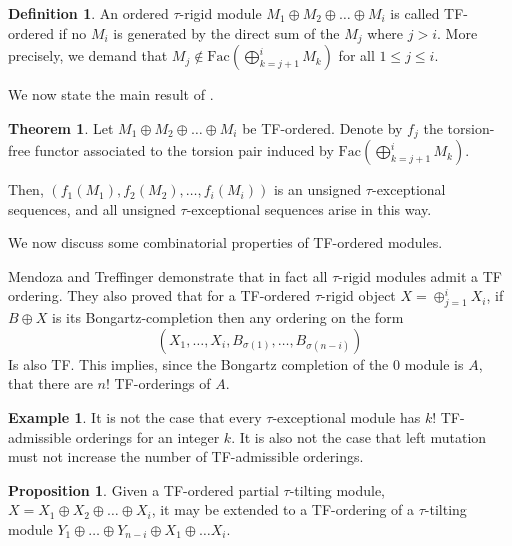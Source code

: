 \documentclass[]{article}
\theoremstyle{definition}
\newtheorem{definition}{Definition}[section]
\newtheorem{theorem}{Theorem}[section]
\newtheorem{proposition}{Proposition}[section]
\newtheorem{example}{Example}[section]
\newcommand{\tu}{\ensuremath{\tau}}
\begin{document}
\begin{definition}\cite{mendoza2020stratifying}
	An ordered \tu-rigid module $M_1 \oplus M_2 \oplus \dots \oplus M_i$ is called TF-ordered if no $M_i$ is generated by the direct sum of the $M_j$ where $j > i$. More precisely, we demand that $M_j \notin \text{Fac}(\bigoplus_{k = j+1}^i M_k)$ for all $1 \leq j \leq i$.
\end{definition}

We now state the main result of \cite{mendoza2020stratifying}.

\begin{theorem}\cite{mendoza2020stratifying}\label{tf-to-tau}
	Let $M_1 \oplus M_2 \oplus \dots \oplus M_i$ be TF-ordered. Denote by $f_j$ the torsion-free functor associated to the torsion pair induced by $\text{Fac}(\bigoplus_{k = j+1}^i M_k)$.
	
	Then, $(f_1(M_1),f_2(M_2),\dots,f_i(M_i))$ is an unsigned \tu-exceptional sequences, and all unsigned \tu-exceptional sequences arise in this way.
\end{theorem}

We now discuss some combinatorial properties of TF-ordered modules.

Mendoza and Treffinger demonstrate that in fact all \tu-rigid modules admit a TF ordering. They also proved that for a TF-ordered \tu-rigid object $X = \oplus_{j = 1}^i X_i$, if $B \oplus X$ is its Bongartz-completion then any ordering on the form \[(X_1,\dots,X_i,B_{\sigma(1)},\dots,B_{\sigma(n-i)})\]
Is also TF. This implies, since the Bongartz completion of the $0$ module is $A$, that there are $n!$ TF-orderings of $A$. 

\begin{example}
	It is not the case that every \tu-exceptional module has $k!$ TF-admissible orderings for an integer $k$. It is also not the case that left mutation must not increase the number of TF-admissible orderings.
 \end{example}
\begin{proposition}
	Given a TF-ordered partial \tu-tilting module, $X = X_1 \oplus X_2 \oplus \dots \oplus X_i$, it may be extended to a TF-ordering of a \tu-tilting module $Y_1 \oplus \dots \oplus Y_{n-i} \oplus X_1 \oplus \dots X_i$.
\end{proposition}
\end{document}
